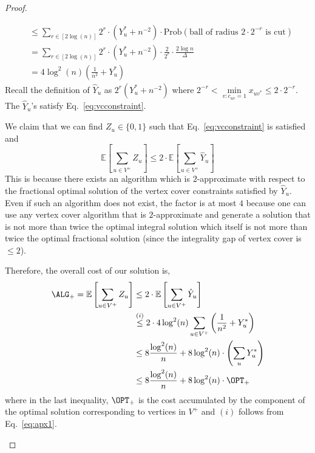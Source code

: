 \begin{proof}
\begin{enumerate}
\begin{align}
	    &\le \sum_{r \in [2 \log(n)]} 2^{r} \cdot (Y_u^* + n^{-2}) \cdot \mathrm{Prob} \left( \text{ball of radius } 2 \cdot 2^{-r} \text{ is cut} \right) \nonumber \\
	    &= \sum_{r \in [2 \log(n)]} 2^r \cdot (Y_u^* + n^{-2}) \cdot \frac{2}{2^r} \cdot \frac{2 \log{n}}{\Delta} \nonumber \\
	    &= 4 \log^2(n) \left( \frac{1}{n^2}+Y_u^* \right) \label{eq:apx1}
	\end{align}
	Recall the definition of $\hat{Y}_u$ as $2^r (Y_u^* + n^{-2} )$ where $2^{-r} < \underset{v : c_{uv} = 1}{\min} x_{uv^*} \le 2 \cdot 2^{-r}$. The $\hat{Y}_u$'s satisfy Eq.~\eqref{eq:vcconstraint}.
	
	We claim that we can find $Z_u \in \{ 0,1 \}$ such that Eq.~\eqref{eq:vcconstraint} is satisfied and \begin{equation*}
	    \mathbb{E} \left[ \sum_{u \in V^+} Z_u \right] \le 2 \cdot \mathbb{E} \left[ \sum_{u \in V^+} \hat{Y}_u \right]
	\end{equation*}
	This is because there exists an algorithm which is $2$-approximate with respect to the fractional optimal solution of the vertex cover constraints satisfied by $\hat{Y}_u$. Even if such an algorithm does not exist, the factor is at most $4$ because one can use any vertex cover algorithm that is $2$-approximate and generate a solution that is not more than twice the optimal integral solution which itself is not more than twice the optimal fractional solution (since the integrality gap of vertex cover is $\le 2$).

	Therefore, the overall cost of our solution is,
	\begin{align*}
	    \ALG_+ = \mathbb{E} \left[ \sum_{u \in V^+} Z_u \right] &\le 2 \cdot \mathbb{E} \left[ \sum_{u \in V^+} \hat{Y}_{u} \right]\\
	    &\overset{(i)}{\le} 2 \cdot 4 \log^2 (n) \sum_{u \in V^+} \left( \frac{1}{n^2}+Y_u^* \right)\\
	    &\leq 8 \frac{\log^2(n)}{n}+ 8 \log^2(n) \cdot \left( \sum_u Y_u^* \right)\\
	    &\le 8 \frac{\log^2(n)}{n} + 8 \log^2(n) \cdot \OPT_+
	\end{align*}
	where in the last inequality, $\OPT_+$ is the cost accumulated by the component of the optimal solution corresponding to vertices in $V^+$ and $(i)$ follows from Eq.~\eqref{eq:apx1}.
	

\end{enumerate}
\end{proof}
